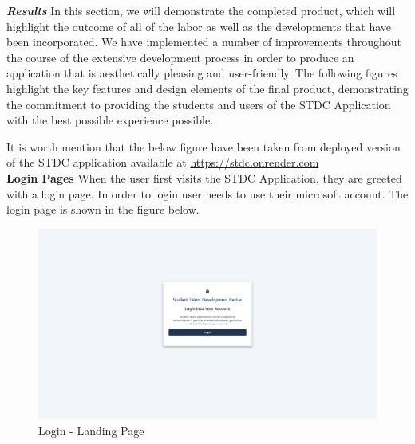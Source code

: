 \begin{justify}
    

    
    
    \clearpage
    \vspace{0.25cm}
    \newendline \textbf{\textit{Results}}\newendline
        In this section, we will demonstrate the completed product, which will highlight the outcome of all of the labor as well as the developments that have been incorporated. We have implemented a number of improvements throughout the course of the extensive development process in order to produce an application that is aesthetically pleasing and user-friendly. The following figures highlight the key features and design elements of the final product, demonstrating the commitment to providing the students and users of the STDC Application with the best possible experience possible.

        \vspace{0.25cm}
        \newendline It is worth mention that the below figure have been taken from deployed version of the STDC application available at \href{https://stdc.onrender.com}{https://stdc.onrender.com}\\

    \noindent \textbf{Login Pages}\newendline
    When the user first visits the STDC Application, they are greeted with a login page. In order to login user needs to use their microsoft account. The login page is shown in the figure below.\\

    \begin{figure}[H]
        \centerline{\includegraphics[width=150mm,scale=1]{figures/implementation_and_testing/implementation/frontend/pages/Login - Landing Page.png}}
        \caption{Login - Landing Page}
    \end{figure}


\end{justify}
